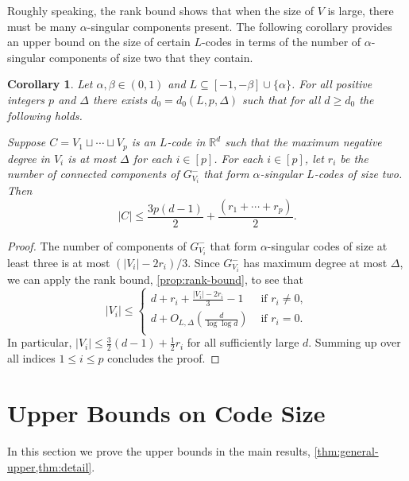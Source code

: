 \documentclass[reqno, 11pt]{amsart}
\newtheorem{corollary}[theorem]{Corollary}
\theoremstyle{definition}
\theoremstyle{remark}
\newcommand{\paren}[1]{\left( #1 \right)}
\newcommand{\RR}{\mathbb{R}}
\begin{document}
Roughly speaking, the rank bound shows that when the size of $V$ is large, there must be many $\alpha$-singular components present. The following corollary provides an upper bound on the size of certain $L$-codes in terms of the number of $\alpha$-singular components of size two that they contain. 

   
\begin{corollary}\label{cor:rank-appl}
Let $\alpha, \beta \in (0,1)$ and $L \subseteq [-1,-\beta] \cup \{\alpha\}$. For all positive integers $p$ and $\Delta$ there exists $d_0 = d_0(L,p,\Delta)$ such that for all $d \geq d_0$ the following holds.

Suppose $C = V_1 \sqcup \cdots \sqcup V_p$ is an $L$-code in $\RR^d$ such that the maximum negative degree in $V_i$ is at most $\Delta$ for each $i \in [p]$. For each $i \in [p]$, let $r_i$ be the number of connected components of $G_{V_i}^-$ that form $\alpha$-singular $L$-codes of size two. Then
    \[
      |C| \leq \frac{3p(d-1)}{2} + \frac{(r_1 + \cdots + r_p)}{2}.
    \]
\end{corollary}

\begin{proof}
		 The number of components of $G_{V_i}^{-}$ that form  $\alpha$-singular codes of size at least three is at most $(|V_i| - 2r_i)/3$. Since $G_{V_i}^-$ has maximum degree at most $\Delta$, we can apply the rank bound, \cref{prop:rank-bound}, to see that
			\[
				|V_i| \leq \begin{cases}
				    d + r_i + \frac{|V_i| - 2r_i}{3} - 1 &\text{ if } r_i \neq 0, \\
                    d + O_{L,\Delta}\paren{\frac{d}{\log\log d}} &\text{ if } r_i = 0. \\
				\end{cases} 
			\]
		In particular, $|V_i| \leq \frac{3}{2}(d-1) + \frac{1}{2}r_i$ for all sufficiently large $d$. Summing up over all indices $ 1 \leq i \leq p$ concludes the proof.
\end{proof}

\section{Upper Bounds on Code Size}\label{sec:upper}

In this section we prove the upper bounds in the main results, \cref{thm:general-upper,thm:detail}. 
\end{document}
